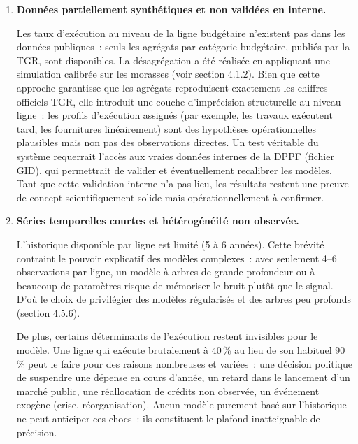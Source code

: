 \begin{enumerate}
    \item \textbf{Donn\'ees partiellement synth\'etiques et non valid\'ees en interne.}
    
    Les taux d'ex\'ecution au niveau de la ligne budg\'etaire n'existent pas dans les
    donn\'ees publiques~: seuls les agr\'egats par cat\'egorie budg\'etaire, publi\'es par
    la TGR, sont disponibles. La d\'esagr\'egation a \'et\'e r\'ealis\'ee en appliquant
    une simulation calibr\'ee sur les morasses (voir section 4.1.2). Bien que cette
    approche garantisse que les agr\'egats reproduisent exactement les chiffres officiels
    TGR, elle introduit une couche d'impr\'ecision structurelle au niveau ligne~: les
    profils d'ex\'ecution assign\'es (par exemple, les travaux ex\'ecutent tard, les
    fournitures lin\'eairement) sont des hypoth\`eses op\'erationnelles plausibles mais
    non pas des observations directes. Un test v\'eritable du syst\`eme requerrait
    l'acc\`es aux vraies donn\'ees internes de la DPPF (fichier GID), qui permettrait
    de valider et \'eventuellement recalibrer les mod\`eles. Tant que cette validation
    interne n'a pas lieu, les r\'esultats restent une preuve de concept scientifiquement
    solide mais op\'erationnellement \`a confirmer.

    \item \textbf{S\'eries temporelles courtes et h\'et\'erog\'en\'eit\'e non observ\'ee.}
    
    L'historique disponible par ligne est limit\'e (5 \`a 6 ann\'ees). Cette br\'evit\'e
    contraint le pouvoir explicatif des mod\`eles complexes~: avec seulement 4--6
    observations par ligne, un mod\`ele \`a arbres de grande profondeur ou \`a beaucoup
    de param\`etres risque de m\'emoriser le bruit plut\^ot que le signal. D'o\`u le
    choix de privil\'egier des mod\`eles r\'egularis\'es et des arbres peu profonds
    (section 4.5.6).
    
    De plus, certains d\'eterminants de l'ex\'ecution restent invisibles pour le
    mod\`ele. Une ligne qui ex\'ecute brutalement \`a 40\,\% au lieu de son habituel 90\,\%
    peut le faire pour des raisons nombreuses et vari\'ees~: une d\'ecision politique
    de suspendre une d\'epense en cours d'ann\'ee, un retard dans le lancement d'un march\'e
    public, une r\'eallocation de cr\'edits non observ\'ee, un \'ev\'enement
    exog\`ene (crise, r\'eorganisation). Aucun mod\`ele purement bas\'e sur l'historique
    ne peut anticiper ces chocs~: ils constituent le plafond inatteignable de pr\'ecision.


\end{enumerate}

